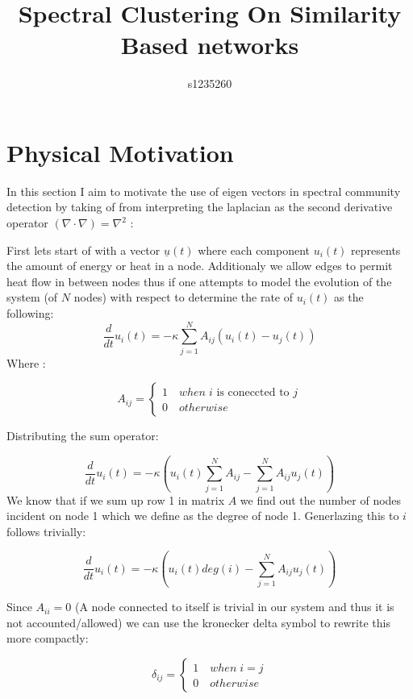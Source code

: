 \documentclass[8pt,twocolumn]{article}
\begin{document}
\title{Spectral Clustering On Similarity Based networks}
\author{s1235260}



\section{Physical Motivation}
In this section I aim to motivate the use of eigen vectors in spectral community detection by
taking of from interpreting the laplacian as the second derivative operator $(\nabla \cdot \nabla) = \nabla^{2}$ :

First lets start of with a vector $\underline{u}(t)$
where each component $u_{i}(t)$ represents the amount of energy or heat in a node. Additionaly we allow edges to permit heat flow in between nodes thus if one attempts to model the evolution of the system (of $N$ nodes) with respect to determine the rate of $u_{i}(t)$  as the following:
\[
\frac{d}{dt}u_{i}(t) = -\kappa \sum_{j=1}^{N}A_{ij}(u_{i}(t) -u_{j}(t))
\]
Where :

\[ A_{ij} = \begin{cases} 
   1 \quad when \; i \text{ is coneccted to } j \\
   0 \quad otherwise 
   \end{cases}
\]

Distributing the sum operator:

\[
\frac{d}{dt}u_{i}(t) = -\kappa \left( u_{i}(t) \sum_{j=1}^{N}A_{ij}-  \sum_{j=1}^{N}A_{ij}u_{j}(t) \right )
\]
We know that if we sum up row 1 in matrix $A$ we find out the number of nodes incident on node 1 which we define as the degree of node 1. Generlazing this to $i$ follows trivially:

\[
\frac{d}{dt}u_{i}(t) = -\kappa \left( u_{i}(t) deg(i)-  \sum_{j=1}^{N}A_{ij}u_{j}(t) \right )
\]

Since $A_{ii}=0$  (A node connected to itself is trivial in our system and thus it is not accounted/allowed) we can use the kronecker delta symbol to rewrite this more compactly:

\[ \delta_{ij} = \begin{cases} 
   1 \quad when \; i = j \\
   0 \quad otherwise 
   \end{cases}
\]
\end{document}
